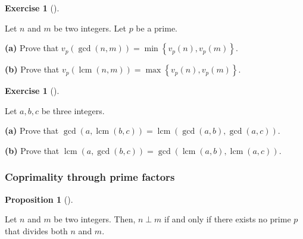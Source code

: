 \documentclass[numbers=enddot,12pt,final,onecolumn,notitlepage]{scrartcl}%
\newcounter{exer}
\numberwithin{exer}{subsection}
\theoremstyle{definition}
\newtheorem{prop}[theo]{Proposition}
\newenvironment{proposition}[1][]
{\begin{prop}[#1]\begin{leftbar}}
{\end{leftbar}\end{prop}}
\newtheorem{exmp}[exer]{Exercise}
\newenvironment{exercise}[1][]
{\begin{exmp}[#1]\begin{leftbar}}
{\end{leftbar}\end{exmp}}
\begin{document}
\begin{exercise}
\label{exe.ent.prime.gcd.1}Let $n$ and $m$ be two integers. Let $p$ be a prime.

\textbf{(a)} Prove that $v_{p}\left(  \gcd\left(  n,m\right)  \right)
=\min\left\{  v_{p}\left(  n\right)  ,v_{p}\left(  m\right)  \right\}  $.

\textbf{(b)} Prove that $v_{p}\left(  \operatorname{lcm}\left(  n,m\right)
\right)  =\max\left\{  v_{p}\left(  n\right)  ,v_{p}\left(  m\right)
\right\}  $.
\end{exercise}

\begin{exercise}
\label{exe.ent.prime.gcd.distrib}Let $a,b,c$ be three integers.

\textbf{(a)} Prove that $\gcd\left(  a,\operatorname{lcm}\left(  b,c\right)
\right)  =\operatorname{lcm}\left(  \gcd\left(  a,b\right)  ,\gcd\left(
a,c\right)  \right)  $.

\textbf{(b)} Prove that $\operatorname{lcm}\left(  a,\gcd\left(  b,c\right)
\right)  =\gcd\left(  \operatorname{lcm}\left(  a,b\right)
,\operatorname{lcm}\left(  a,c\right)  \right)  $.
\end{exercise}

\subsubsection{Coprimality through prime factors}

\begin{proposition}
\label{prop.ent.coprime.via-primes}Let $n$ and $m$ be two integers. Then,
$n\perp m$ if and only if there exists no prime $p$ that divides both $n$ and
$m$.
\end{proposition}
\end{document}
